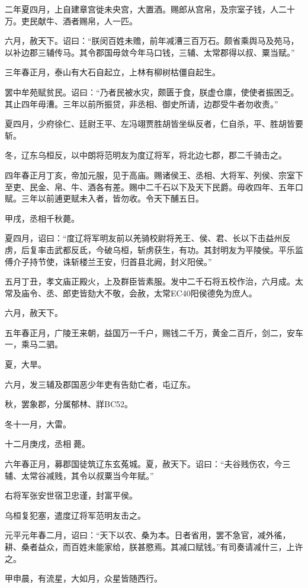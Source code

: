 \documentclass[]{article}
\begin{document}
二年夏四月，上自建章宫徙未央宫，大置酒。赐郎从宫帛，及宗室子钱，人二十万。吏民献牛、酒者赐帛，人一匹。

六月，赦天下。诏曰：``朕闵百姓未赡，前年减漕三百万石。颇省乘舆马及苑马，以补边郡三辅传马。其令郡国毋敛今年马口钱，三辅、太常郡得以叔、粟当赋。''

三年春正月，泰山有大石自起立，上林有柳树枯僵自起生。

罢中牟苑赋贫民。诏曰：``乃者民被水灾，颇匮于食，朕虚仓廪，使使者振困乏。其止四年毋漕。三年以前所振贷，非丞相、御史所请，边郡受牛者勿收责。''

夏四月，少府徐仁、廷尉王平、左冯翊贾胜胡皆坐纵反者，仁自杀，平、胜胡皆要斩。

冬，辽东乌桓反，以中朗将范明友为度辽将军，将北边七郡，郡二千骑击之。

四年春正月丁亥，帝加元服，见于高庙。赐诸侯王、丞相、大将军、列侯、宗室下至吏、民金、帛、牛、酒各有差。赐中二千石以下及天下民爵。毋收四年、五年口赋。三年以前逋更赋未入者，皆勿收。令天下酺五日。

甲戌，丞相千秋薨。

夏四月，诏曰：``度辽将军明友前以羌骑校尉将羌王、侯、君、长以下击益州反虏，后复率击武都反氐，今破乌桓，斩虏获生，有功。其封明友为平陵侯。平乐监傅介子持节使，诛斩楼兰王安，归首县北阙，封义阳侯。''

五月丁丑，孝文庙正殿火，上及群臣皆素服。发中二千石将五校作治，六月成。太常及庙令、丞、郎吏皆劾大不敬，会赦，太常EC40阳侯德免为庶人。

六月，赦天下。

五年春正月，广陵王来朝，益国万一千户，赐钱二千万，黄金二百斤，剑二，安车一，乘马二驷。

夏，大旱。

六月，发三辅及郡国恶少年吏有告劾亡者，屯辽东。

秋，罢象郡，分属郁林、牂BC52。

冬十一月，大雷。

十二月庚戌，丞相薨。

六年春正月，募郡国徒筑辽东玄菟城。夏，赦天下。诏曰：``夫谷贱伤农，今三辅、太常谷减贱，其令以叔粟当今年赋。''

右将军张安世宿卫忠谨，封富平侯。

乌桓复犯塞，遣度辽将军范明友击之。

元平元年春二月，诏曰：``天下以农、桑为本。日者省用，罢不急官，减外徭，耕、桑者益众，而百姓未能家给，朕甚愍焉。其减口赋钱。''有司奏请减什三，上许之。

甲申晨，有流星，大如月，众星皆随西行。
\end{document}
